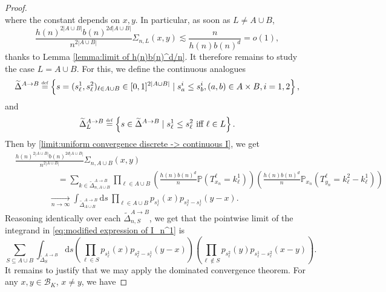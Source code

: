 \documentclass[10pt,a4paper]{amsart}
\newcommand{\PP}{\mathbb P}
\newcommand{\1}{\mathds{1}}
\renewcommand{\d}{\mathrm d}
\newcommand{\eqdef}{\stackrel{\scaleto{\mathrm{def}}{3.5pt}}{=}}
\numberwithin{equation}{section}
\begin{document}
\begin{proof}
\begin{equation*}
    \end{equation*}
    where the constant depends on $x,y$. In particular, as soon as $L\ne A\cup B$,
    \begin{equation*}
        \frac{h(n)^{2|A\cup B|}b(n)^{2d|A\cup B|}}{n^{2|A\cup B|}}\Sigma_{n,L}(x,y)\lesssim \frac{n}{h(n)b(n)^d}=o(1),
    \end{equation*}
    thanks to Lemma \ref{lemma:limit of h(n)b(n)^d/n}. It therefore remains to study the case $L=A\cup B$. For this, we define the continuous analogues
    \begin{equation*}
        \widetilde\Delta^{A\rightarrow B}\eqdef\left\{s=(s_\ell^1,s_\ell^2)_{\ell\in A\cup B}\in[0,1]^{2|A\cup B|}\mid s_a^i\le s_b^i, (a,b)\in A\times B,i=1,2\right\},
    \end{equation*}
    and
    \begin{equation*}
        \widetilde\Delta_{L}^{A\rightarrow B}\eqdef\left\{s\in\widetilde\Delta^{A\rightarrow B}\mid s_\ell^1\le s_\ell^2\text{ iff }\ell\in L\right\}.
    \end{equation*}
    Then by \eqref{limit:uniform convergence discrete -> continuous I}, we get
    \begin{align*}
        &\frac{h(n)^{2|A\cup B|}b(n)^{2d|A\cup B|}}{n^{2|A\cup B|}}\Sigma_{n,A\cup B}(x,y)\\
        &\hspace{5em}=\sum_{k\in\widetilde\Delta_{n,A\cup B}^{A\rightarrow B}}\prod_{\ell\in A\cup B}\left(\frac{h(n)b(n)^d}{n}\PP\left(T_{x_n}^\ell=k_\ell^1\right)\right)\left(\frac{h(n)b(n)^d}{n}\PP_{x_n}\left(T_{y_n}^\ell=k_\ell^2-k_\ell^1\right)\right)\\
        &\hspace{4em}\underset{n\rightarrow\infty}{\longrightarrow}\int_{\widetilde \Delta_{A\cup B}^{A\rightarrow B}}\d s\ \prod_{\ell\in A\cup B}p_{s_\ell^1}(x)p_{s_\ell^2-s_\ell^1}(y-x).
    \end{align*}
    Reasoning identically over each $\widetilde \Delta_{n,S}^{A\rightarrow B}$, we get that the pointwise limit of the integrand in \eqref{eq:modified expression of I_n^1} is 
    \begin{equation*}
        \sum_{S\subseteq A\cup B}\int_{\widetilde\Delta_S^{A\rightarrow B}}\d s\left(\prod_{\ell\in S}p_{s_\ell^1}(x) p_{s_\ell^2-s_\ell^1}(y-x)\right)\left(\prod_{\ell\notin S}p_{s_\ell^2}(y) p_{s_\ell^1-s_\ell^2}(x-y)\right).
    \end{equation*}
    It remains to justify that we may apply the dominated convergence theorem. For any $x,y\in\mathcal B_K$, $x\ne y$, we have

\end{proof}
\end{document}
